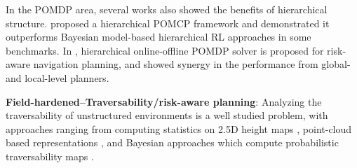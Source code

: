 \documentclass{article}
\newcommand{\ph}[1]{{\textbf{#1}:}} %
\begin{document}
In the POMDP area, several works also showed the benefits of hierarchical structure.
\citet{vien2015hierarchical} proposed a hierarchical POMCP framework and demonstrated it outperforms Bayesian model-based hierarchical RL approaches in some benchmarks.
In \cite{kim2019bi}, hierarchical online-offline POMDP solver is proposed for risk-aware navigation planning, and showed synergy in the performance from global- and local-level planners.



\ph{Field-hardened--Traversability/risk-aware planning}
Analyzing the traversability of unstructured environments is a well studied problem, with approaches ranging from computing statistics on 2.5D height maps \cite{rankin2009stereo}, point-cloud based representations \cite{krusi2017driving}, and Bayesian approaches which compute probabilistic traversability maps \cite{pmlr-v87-shan18a}.  



\end{document}
